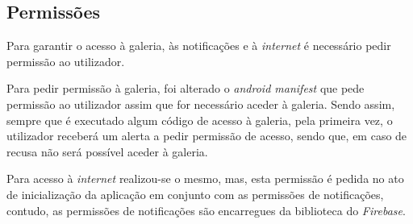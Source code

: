 \subsection{Permissões}

Para garantir o acesso à galeria, às notificações e à \textit{internet} é necessário pedir permissão ao utilizador.

Para pedir permissão à galeria, foi alterado o \textit{android manifest} que pede permissão ao utilizador assim que for necessário aceder à galeria. Sendo assim, sempre que é executado algum código de acesso à galeria, pela primeira vez, o utilizador receberá um alerta a pedir permissão de acesso, sendo que, em caso de recusa não será possível aceder à galeria.

Para acesso à \textit{internet} realizou-se o mesmo, mas, esta permissão é pedida no ato de inicialização da aplicação em conjunto com as permissões de notificações, contudo, as permissões de notificações são encarregues da biblioteca do \textit{Firebase}.